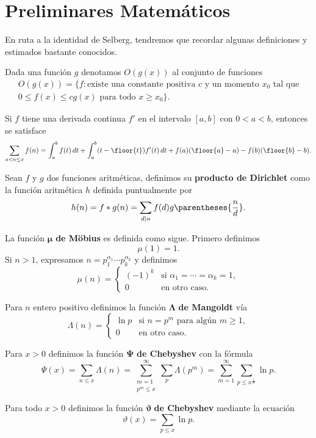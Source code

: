 \setlength{\headheight}{14.61858pt}
\pagestyle{fancy}

\chapter[Preliminares Matem\'aticos]
{Preliminares Matem\'aticos}
\label{Chapter02}

En ruta a la identidad de Selberg,
tendremos que recordar algunas definiciones y estimados bastante conocidos.

Dada una funci\'on \(g\) denotamos \(O(g(x))\) al conjunto de funciones
\[
  \begin{gathered}
    O(g(x)) = \{f : \text{existe una constante positiva } c \text{ y un momento } x_0 \text{ tal que} \\
    0 \leq f(x) \leq cg(x) \text{ para todo } x \geq x_0\}.
  \end{gathered}
\]

\begin{theorem}
Si \(f\) tiene una derivada continua \(f'\) en el intervalo \([a, b]\)
con \(0 < a < b\), entonces se satisface
\[
  \sum_{a < n \leq x} f(n) = \int_a^b f(t) \, dt +
  \int_a^b (t - \floor{t}) f'(t) \, dt +
  f(a)(\floor{a} - a) - f(b)(\floor{b} - b).
\]
\end{theorem}

Sean \(f\) y \(g\) dos funciones aritm\'eticas, 
definimos su \textbf{producto de Dirichlet} como la funci\'on aritm\'etica
\(h\) definida puntualmente por 
\[
  h(n)
  = f * g(n)
  = \sum_{d \mid n} f(d) g \parentheses{\frac{n}{d}}.
\]

La funci\'on \(\boldsymbol{\mu}\) \textbf{de M\"{o}bius} es definida como sigue. 
Primero definimos 
\[
  \mu(1) = 1.
\]
Si \(n > 1\),
expresamos \(n = p_1^{\alpha_1} \cdots p_k^{\alpha_k}\) y definimos
\[
  \mu(n) = 
  \begin{cases}
    (-1)^k &\text{si } \alpha_1 = \cdots = \alpha_k = 1, \\
    0 &\text{en otro caso}. 
  \end{cases}
\]

Para \(n\) entero positivo definimos la funci\'on
\(\boldsymbol{\Lambda}\) \textbf{de Mangoldt} v\'ia 
\[
  \Lambda(n) =
  \begin{cases}
    \ln p &\text{si } n = p^m \text{ para alg\'un } m \geq 1,\\
    0 &\text{en otro caso.}
  \end{cases}
\]

Para \(x > 0\) definimos la funci\'on
\(\boldsymbol{\Psi}\) \textbf{de Chebyshev} con la f\'ormula
\[
  \Psi(x)
  = \sum_{n \leq x} \Lambda(n) 
  = \sum_{\substack{m = 1\\p^m \leq x}}^\infty \sum_p \Lambda(p^m)
  = \sum_{m = 1}^\infty \sum_{p \leq x^{\frac{1}{m}}} \ln p.
\]

Para todo \(x > 0\) definimos la funci\'on \(\boldsymbol{\vartheta}\)
\textbf{de Chebyshev} mediante la ecuaci\'on
\[
  \vartheta(x) = \sum_{p \leq x} \ln p.
\]
